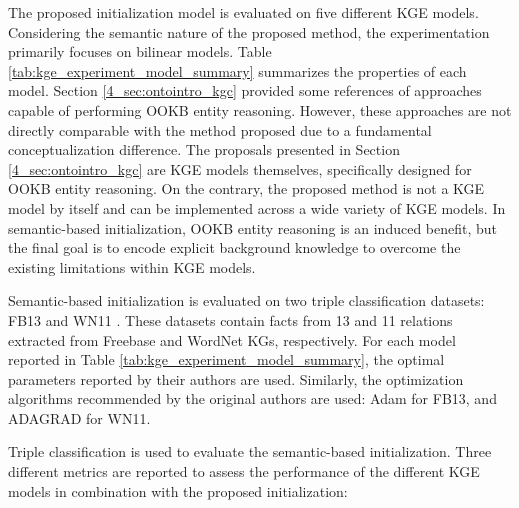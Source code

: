 The proposed initialization model is evaluated on five different KGE models. Considering the semantic nature of the proposed method, the experimentation primarily focuses on bilinear models. Table \ref{tab:kge_experiment_model_summary} summarizes the properties of each model. Section \ref{4_sec:ontointro_kgc} provided some references of approaches capable of performing OOKB entity reasoning. However, these approaches are not directly comparable with the method proposed due to a fundamental conceptualization difference. The proposals presented in Section \ref{4_sec:ontointro_kgc} are KGE models themselves, specifically designed for OOKB entity reasoning. On the contrary, the proposed method is not a KGE model by itself and can be implemented across a wide variety of KGE models. In semantic-based initialization, OOKB entity reasoning is an induced benefit, but the final goal is to encode explicit background knowledge to overcome the existing limitations within KGE models.

Semantic-based initialization is evaluated on two triple classification datasets: FB13 \citep{neuraltensornetwork,Bollacker:2008:FCC:1376616.1376746} and WN11 \citep{Miller95wordnet:a}. These datasets contain facts from 13 and 11 relations extracted from Freebase and WordNet KGs, respectively. For each model reported in Table \ref{tab:kge_experiment_model_summary}, the optimal parameters reported by their authors are used. Similarly, the optimization algorithms recommended by the original authors are used: Adam \cite{adam} for FB13, and ADAGRAD \cite{adagrad} for WN11.

Triple classification is used to evaluate  the semantic-based initialization. Three different metrics are reported to assess the performance of the different KGE models in combination with the proposed initialization:

